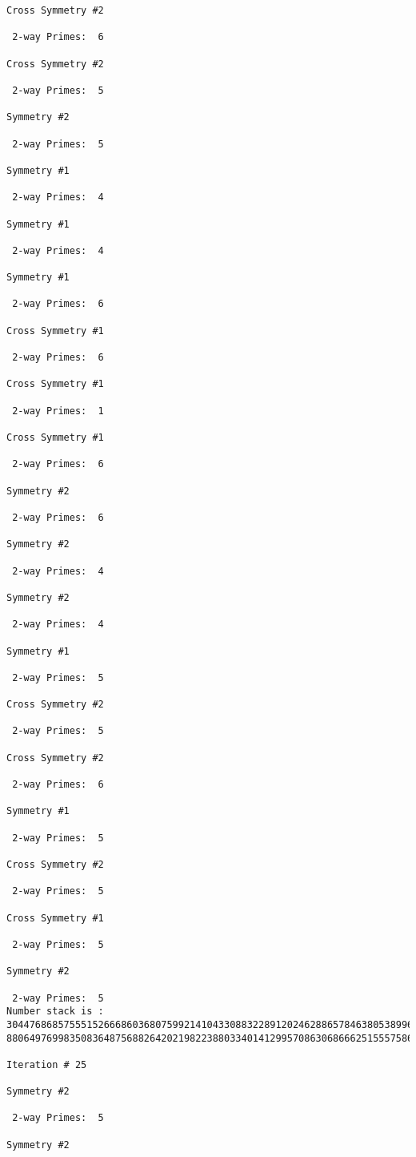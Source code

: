 {{{{\begin{verbatim}
Cross Symmetry #2

 2-way Primes: 	6

Cross Symmetry #2

 2-way Primes: 	5

Symmetry #2

 2-way Primes: 	5

Symmetry #1

 2-way Primes: 	4

Symmetry #1

 2-way Primes: 	4

Symmetry #1

 2-way Primes: 	6

Cross Symmetry #1

 2-way Primes: 	6

Cross Symmetry #1

 2-way Primes: 	1

Cross Symmetry #1

 2-way Primes: 	6

Symmetry #2

 2-way Primes: 	6

Symmetry #2

 2-way Primes: 	4

Symmetry #2

 2-way Primes: 	4

Symmetry #1

 2-way Primes: 	5

Cross Symmetry #2

 2-way Primes: 	5

Cross Symmetry #2

 2-way Primes: 	6

Symmetry #1

 2-way Primes: 	5

Cross Symmetry #2

 2-way Primes: 	5

Cross Symmetry #1

 2-way Primes: 	5

Symmetry #2

 2-way Primes: 	5
Number stack is :
30447686857555152666860368075992141043308832289120246288657846380538996794608835958544046240163340857
88064976998350836487568826420219822388033401412995708630686662515557586867440375804336104264044585953

Iteration #	25

Symmetry #2

 2-way Primes: 	5

Symmetry #2


\end{verbatim}}}}}
